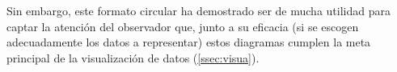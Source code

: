 \documentclass{article}\usepackage[]{graphicx}\usepackage[]{color}
\begin{document}
Sin embargo, este formato circular ha demostrado ser de mucha utilidad para captar la atenci\'on del observador que, junto a su eficacia (si se escogen adecuadamente los datos a representar) estos diagramas cumplen la meta principal de la visualizaci\'on de datos (\ref{ssec:visua}). 
\newpage
\section*{}


\end{document}
